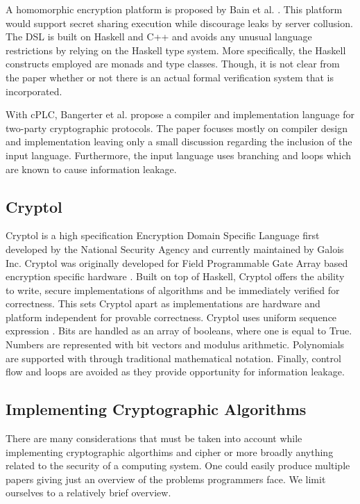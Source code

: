 A homomorphic encryption platform is proposed by Bain et al. \cite{Bain}. This platform would support secret sharing execution while discourage leaks by server collusion. The DSL is built on Haskell and C++ and avoids any unusual language restrictions by relying on the Haskell type system. More specifically, the Haskell constructs employed are monads and type classes. Though, it is not clear from the paper whether or not there is an actual formal verification system that is incorporated.  

With cPLC, Bangerter et al. \cite{Bangerter} propose a compiler and implementation language for two-party cryptographic protocols. The paper focuses mostly on compiler design and implementation leaving only a small discussion regarding the inclusion of the input language. Furthermore, the input language uses branching and loops which are known to cause information leakage. 


\subsection{Cryptol}
Cryptol is a high specification Encryption Domain Specific Language first developed by the National Security Agency and currently maintained by Galois Inc. Cryptol was originally developed for Field Programmable Gate Array based encryption specific hardware \cite{Lewis}. Built on top of Haskell, Cryptol offers the ability to write, secure implementations of algorithms and be immediately verified for correctness. This sets Cryptol apart as implementations are hardware and platform independent for provable correctness. Cryptol uses uniform sequence expression \cite{Lewis}. Bits are handled as an array of booleans, where one is equal to True. Numbers are represented with bit vectors and modulus arithmetic. Polynomials are supported with through traditional mathematical notation. Finally, control flow and loops are avoided as they provide opportunity for information leakage. 

\subsection{Implementing Cryptographic Algorithms}
There are many considerations that must be taken into account while implementing cryptographic algorthims and cipher or more broadly anything related to the security of 
a computing system\cite{CryptoCoding}. One could easily produce multiple papers giving just an overview of the problems programmers face. We limit ourselves to a relatively brief overview.

